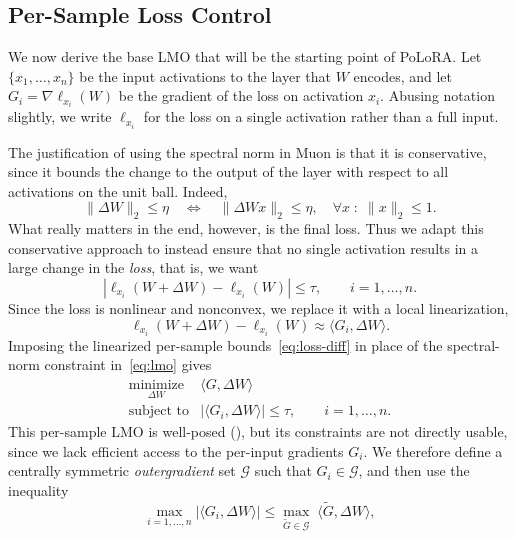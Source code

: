 \documentclass[11pt]{article}
\newcommand{\ip}[1]{\langle #1 \rangle}
\newcommand{\methodname}{PoLoRA\xspace}
\theoremstyle{plain}
\theoremstyle{definition}
\theoremstyle{remark}
\theoremstyle{definition}
\begin{document}
\subsection{Per-Sample Loss Control}\label{sec:sample-loss-lmo}
We now derive the base LMO that will be the starting point of \methodname{}.
Let $\{x_1, \ldots, x_n\}$ be the input activations to the layer that $W$ encodes, and let $G_i = \nabla \ell_{x_i}(W)$ be the gradient of the loss on activation $x_i$. Abusing notation slightly, we write $\ell_{x_i}$ for the loss on a single activation rather than a full input.

The justification of using the spectral norm in Muon is that it is conservative, since it bounds the change to the output of the layer with respect to all activations on the unit ball. Indeed,
\[\| \Delta W \|_2 \leq \eta \quad \Leftrightarrow \quad \| \Delta W x\|_2 \leq \eta, \quad \forall x\;: \;\|x\|_2 \leq 1.\]
What really matters in the end, however, is the final loss.
Thus we adapt this conservative approach to instead ensure that no single activation results in a large change in the \emph{loss}, that is, we want
\begin{equation}\label{eq:loss-diff}
     |\ell_{x_i}(W +\Delta W) - \ell_{x_i} (W)|\leq \tau, \qquad  i=1,\ldots, n.
\end{equation} 
Since the loss is nonlinear and nonconvex, we replace it with a local linearization,
\[  
\ell_{x_i}(W +\Delta W) -\ell_{x_i} (W)  \approx \ip{G_i, \Delta W}. 
\]
Imposing the linearized per-sample bounds~\eqref{eq:loss-diff} in place of the spectral-norm constraint in~\eqref{eq:lmo} gives
\begin{equation}
 \begin{array}{ll}
  \underset{\Delta W}{\mathrm{minimize}} &
  \ip{G, \Delta W} \\
  \mbox{subject to} &
  \displaystyle  
|\ip{G_i, \Delta W}|
  \le \tau, \qquad i=1,\ldots, n.
  \end{array}
  \label{eq:sample-lmo}
\end{equation}
This per-sample LMO is well-posed (), but its constraints are not directly usable, since we lack efficient access to the per-input gradients $G_i$. We therefore define a centrally symmetric \emph{outergradient} set $\mathcal{G}$ such that $G_i \in \mathcal{G}$, and then use the inequality
\begin{equation} \label{eq:outgrad1}
    \max_{i=1,\ldots, n}  |\ip{G_i, \Delta W}|
    \leq   \max_{\widetilde{G} \in \mathcal{G}} \; \ip{\widetilde{G}, \Delta W},
\end{equation} 
\end{document}
